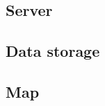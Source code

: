 \subsection{Server} %
\label{sub:server}


\subsection{Data storage} %
\label{sub:technology_data_storage}


\subsection{Map} %
\label{sub:map}



